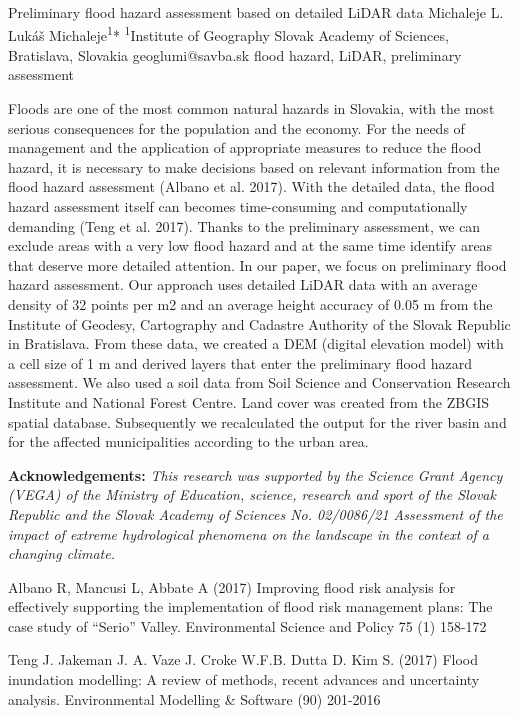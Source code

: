 \abstract
{Preliminary flood hazard assessment based on detailed LiDAR data} 
{Michaleje L.} 
{Lukáš Michaleje\textsuperscript{1}*} 
{\TLtag} 
{
\textsuperscript{1}Institute of Geography Slovak Academy of Sciences, Bratislava, Slovakia
}
{geoglumi@savba.sk}  %
{flood hazard, LiDAR, preliminary assessment}
{
Floods are one of the most common natural hazards in Slovakia, with the most serious consequences for the population and the economy. For the needs of management and the application of appropriate measures to reduce the flood hazard, it is necessary to make decisions based on relevant information from the flood hazard assessment (Albano et al. 2017). With the detailed data, the flood hazard assessment itself can becomes time-consuming and computationally demanding (Teng et al. 2017). Thanks to the preliminary assessment, we can exclude areas with a very low flood hazard and at the same time identify areas that deserve more detailed attention.
In our paper, we focus on preliminary flood hazard assessment. Our approach uses detailed LiDAR data with an average density of 32 points per m2 and an average height accuracy of 0.05 m from the Institute of Geodesy, Cartography and Cadastre Authority of the Slovak Republic in Bratislava. From these data, we created a DEM (digital elevation model) with a cell size of 1 m and derived layers that enter the preliminary flood hazard assessment. We also used a soil data from Soil Science and Conservation Research Institute and National Forest Centre. Land cover was created from the ZBGIS spatial database. Subsequently we recalculated the output for the river basin and for the affected municipalities according to the urban area.

\vspace{0.5em}
\noindent
\textbf{Acknowledgements:}
\textit{This research was supported by the Science Grant Agency (VEGA) of the Ministry of Education, science, research and sport of the Slovak Republic and the Slovak Academy of Sciences No. 02/0086/21 Assessment of the impact of extreme hydrological phenomena on the landscape in the context of a changing climate.}
}
{Albano R, Mancusi L, Abbate A (2017) Improving flood risk analysis for effectively supporting the implementation of flood risk management plans: The case study of “Serio” Valley. Environmental Science and Policy 75 (1) 158-172 

Teng J. Jakeman J. A. Vaze J. Croke W.F.B. Dutta D. Kim S. (2017) Flood inundation modelling: A review of methods, recent advances and uncertainty analysis. Environmental Modelling \& Software (90) 201-2016 	
}

